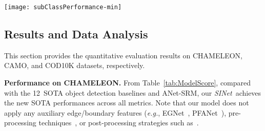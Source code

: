 \documentclass[10pt,journal,compsoc]{IEEEtran}
\def\eg{\emph{e.g.}}
\newcommand{\myPara}[1]{\vspace{6pt}\noindent\textbf{#1}\qquad }
\newcommand{\tabref}[1]{Table~\ref{#1}}
\def\ournewmodel{\emph{SINet}}
\def\baselineN{12}
\begin{document}
\begin{figure*}[t!]
  \centering
  \texttt{[image: subClassPerformance-min]}
  \vspace{-15pt}
  \caption{\textbf{Per-subclass performance.}
    Sub-classes are sorted by \emph{difficulty}, 
    determined by the mean $S_\alpha$~\cite{fan2017structure} across 
    \baselineN~baselines. 
    We also provide the minimum (bottom line) and maximum (top line) 
    $S_\alpha$ for each sub-class.
  }\label{fig:subClassPerformance}
\end{figure*}



\subsection{Results and Data Analysis}
This section provides the quantitative evaluation results on CHAMELEON, 
CAMO, and COD10K datasets, respectively.

\myPara{Performance on CHAMELEON.}
%
From \tabref{tab:ModelScore}, compared with the \baselineN~SOTA object 
detection baselines and ANet-SRM, 
our \ournewmodel~achieves the new SOTA performances across all metrics.
%
Note that our model does not apply any auxiliary edge/boundary features 
(\eg, EGNet~\cite{zhao2019EGNet}, PFANet~\cite{zhao2019pyramid}), 
pre-processing techniques~\cite{mori2005guiding}, 
or post-processing strategies such as~\cite{kra2011efficient,boykov1999fast}.


\end{document}
